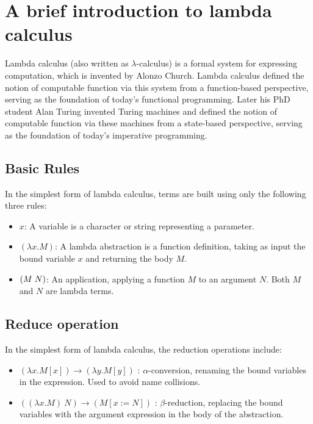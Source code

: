 
\section{A brief introduction to lambda calculus}

Lambda calculus (also written as $\lambda$-calculus) is a formal system for expressing computation, which is invented by Alonzo Church. Lambda calculus defined the notion of computable function via this system from a function-based perspective, serving as the foundation of today's functional programming. Later his PhD student Alan Turing invented Turing machines and defined the notion of computable function via these machines from a state-based perspective, serving as the foundation of today's imperative programming. 

\subsection{Basic Rules}
In the simplest form of lambda calculus, terms are built using only the following three rules:

\begin{itemize}
    \item $x$: A variable is a character or string representing a parameter.
    \item $(\lambda x.M)$: A lambda abstraction is a function definition, taking as input the bound variable $x$ and returning the body $M$.
    \item $(M \hspace{0.1cm} N)$: An application, applying a function $M$ to an argument $N$. Both $M$ and $N$ are lambda terms.
\end{itemize}

\subsection{Reduce operation}
In the simplest form of lambda calculus, the reduction operations include:

\begin{itemize}
    \item $(\lambda x.M[x])\rightarrow (\lambda y.M[y])$ : $\alpha$-conversion, renaming the bound variables in the expression. Used to avoid name collisions.
    \item $((\lambda x.M)\ N)\rightarrow (M[x:=N])$ : $\beta$-reduction, replacing the bound variables with the argument expression in the body of the abstraction.
\end{itemize}